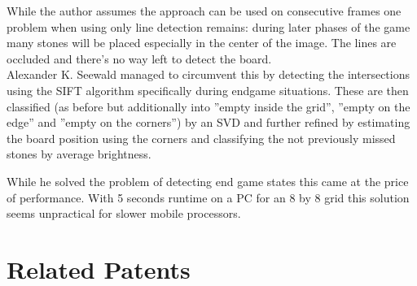	While the author assumes the approach can be used on consecutive frames one problem when using only line detection remains: during later phases of the game many stones will be placed especially in the center of the image. The lines are occluded and there's no way left to detect the board.
	\\

	Alexander K. Seewald \cite{seewald2010automatic} managed to circumvent this by detecting the intersections using the SIFT algorithm specifically during endgame situations. These are then classified (as before but additionally into ''empty inside the grid'', ''empty on the edge'' and ''empty on the corners'') by an SVD and further refined by estimating the board position using the corners and classifying the not previously missed stones by average brightness.

	While he solved the problem of detecting end game states this came at the price of performance. With 5 seconds runtime on a PC for an 8 by 8 grid this solution seems unpractical for slower mobile processors.

	\section{Related Patents}

